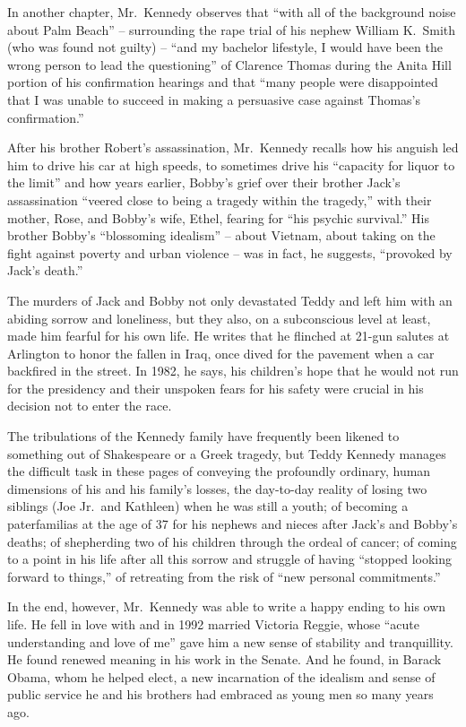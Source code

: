 ﻿\documentclass[12pt]{article}
\begin{document}
In another chapter, Mr.~Kennedy observes that ``with all of the background noise about Palm Beach''
-- surrounding the rape trial of his nephew William K.~Smith (who was found not guilty) -- ``and my
bachelor lifestyle, I would have been the wrong person to lead the questioning'' of Clarence Thomas
during the Anita Hill portion of his confirmation hearings and that ``many people were disappointed
that I was unable to succeed in making a persuasive case against Thomas's confirmation.''

After his brother Robert's assassination, Mr.~Kennedy recalls how his anguish led him to drive his
car at high speeds, to sometimes drive his ``capacity for liquor to the limit'' and how years
earlier, Bobby's grief over their brother Jack's assassination ``veered close to being a tragedy
within the tragedy,'' with their mother, Rose, and Bobby's wife, Ethel, fearing for ``his psychic
survival.'' His brother Bobby's ``blossoming idealism'' -- about Vietnam, about taking on the fight
against poverty and urban violence -- was in fact, he suggests, ``provoked by Jack's death.''

The murders of Jack and Bobby not only devastated Teddy and left him with an abiding sorrow and
loneliness, but they also, on a subconscious level at least, made him fearful for his own life. He
writes that he flinched at 21-gun salutes at Arlington to honor the fallen in Iraq, once dived for
the pavement when a car backfired in the street. In 1982, he says, his children's hope that he would
not run for the presidency and their unspoken fears for his safety were crucial in his decision not
to enter the race.

The tribulations of the Kennedy family have frequently been likened to something out of Shakespeare
or a Greek tragedy, but Teddy Kennedy manages the difficult task in these pages of conveying the
profoundly ordinary, human dimensions of his and his family's losses, the day-to-day reality of
losing two siblings (Joe Jr.~and Kathleen) when he was still a youth; of becoming a paterfamilias at
the age of 37 for his nephews and nieces after Jack's and Bobby's deaths; of shepherding two of his
children through the ordeal of cancer; of coming to a point in his life after all this sorrow and
struggle of having ``stopped looking forward to things,'' of retreating from the risk of ``new
personal commitments.''

In the end, however, Mr.~Kennedy was able to write a happy ending to his own life. He fell in love
with and in 1992 married Victoria Reggie, whose ``acute understanding and love of me'' gave him a
new sense of stability and tranquillity. He found renewed meaning in his work in the Senate. And he
found, in Barack Obama, whom he helped elect, a new incarnation of the idealism and sense of public
service he and his brothers had embraced as young men so many years ago.
\end{document}
